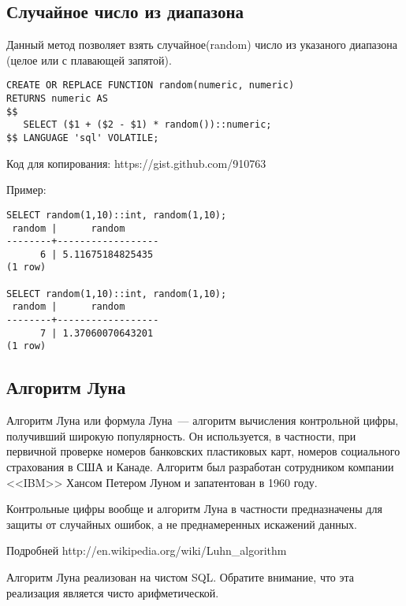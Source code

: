 \subsection{Случайное число из диапазона}
\begin{framed}
Данный метод позволяет взять случайное(random) число из указаного диапазона (целое или с плавающей запятой).
\end{framed}

\begin{lstlisting}[label=lst:snippets8,caption=Случайное число из диапазона. SQL запрос]
CREATE OR REPLACE FUNCTION random(numeric, numeric)
RETURNS numeric AS
$$
   SELECT ($1 + ($2 - $1) * random())::numeric;
$$ LANGUAGE 'sql' VOLATILE;
\end{lstlisting}

Код для копирования: https://gist.github.com/910763

Пример:
\begin{lstlisting}[label=lst:snippets9,caption=Случайное число из диапазона. Пример]
SELECT random(1,10)::int, random(1,10);
 random |      random      
--------+------------------
      6 | 5.11675184825435
(1 row)

SELECT random(1,10)::int, random(1,10);
 random |      random      
--------+------------------
      7 | 1.37060070643201
(1 row)
\end{lstlisting}

\subsection{Алгоритм Луна}
\begin{framed}
Алгоритм Луна или формула Луна~--- алгоритм вычисления контрольной цифры, получивший широкую популярность. 
Он используется, в частности, при первичной проверке номеров банковских пластиковых карт, номеров социального 
страхования в США и Канаде. Алгоритм был разработан сотрудником компании <<IBM>> Хансом Петером Луном и 
запатентован в 1960 году.

Контрольные цифры вообще и алгоритм Луна в частности предназначены для защиты от случайных ошибок, 
а не преднамеренных искажений данных.

Подробней http://en.wikipedia.org/wiki/Luhn\_algorithm


Алгоритм Луна реализован на чистом SQL. Обратите внимание, что эта реализация является чисто арифметической.
\end{framed}

